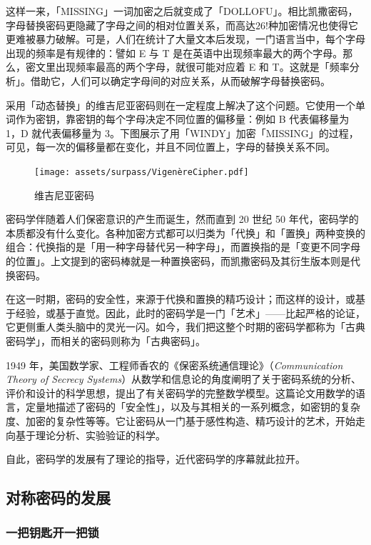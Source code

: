 这样一来，「MISSING」一词加密之后就变成了「DOLLOFU」。相比凯撒密码，字母替换密码更隐藏了字母之间的相对位置关系，而高达$26!$种加密情况也使得它更难被暴力破解。可是，人们在统计了大量文本后发现，一门语言当中，每个字母出现的频率是有规律的：譬如 E 与 T 是在英语中出现频率最大的两个字母。那么，密文里出现频率最高的两个字母，就很可能对应着 E 和 T。这就是「频率分析」。借助它，人们可以确定字母间的对应关系，从而破解字母替换密码。

采用「动态替换」的维吉尼亚密码则在一定程度上解决了这个问题。它使用一个单词作为密钥，靠密钥的每个字母决定不同位置的偏移量：例如 B 代表偏移量为 1，D 就代表偏移量为 3。下图展示了用「WINDY」加密「MISSING」的过程，可见，每一次的偏移量都在变化，并且不同位置上，字母的替换关系不同。

\begin{figure}[htb!]
  \centering
  \texttt{[image: assets/surpass/VigenèreCipher.pdf]}
  \caption{维吉尼亚密码}
  \label{fig:VigenèreCipher}
\end{figure}

密码学伴随着人们保密意识的产生而诞生，然而直到 20 世纪 50 年代，密码学的本质都没有什么变化。各种加密方式都可以归类为「代换」和「置换」两种变换的组合：代换指的是「用一种字母替代另一种字母」，而置换指的是「变更不同字母的位置」。上文提到的密码棒就是一种置换密码，而凯撒密码及其衍生版本则是代换密码。

在这一时期，密码的安全性，来源于代换和置换的精巧设计；而这样的设计，或基于经验，或基于直觉。因此，此时的密码学是一门「艺术」——比起严格的论证，它更侧重人类头脑中的灵光一闪。如今，我们把这整个时期的密码学都称为「古典密码学」，而相关的密码则称为「古典密码」。

1949 年，美国数学家、工程师香农的《保密系统通信理论》（\textit{Communication Theory of Secrecy Systems}）从数学和信息论的角度阐明了关于密码系统的分析、评价和设计的科学思想，提出了有关密码学的完整数学模型。这篇论文用数学的语言，定量地描述了密码的「安全性」，以及与其相关的一系列概念，如密钥的复杂度、加密的复杂性等等。它让密码从一门基于感性构造、精巧设计的艺术，开始走向基于理论分析、实验验证的科学。

自此，密码学的发展有了理论的指导，近代密码学的序幕就此拉开。

\subsection{对称密码的发展}

\subsubsection{一把钥匙开一把锁}

